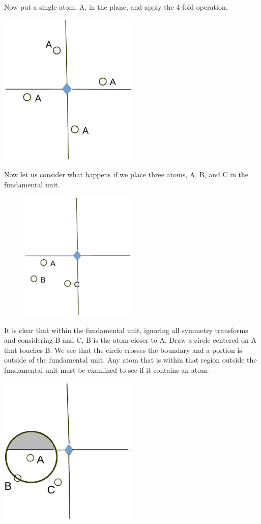 \documentclass[preprint]{iucr}              %
\numberwithin{equation}{section}
\begin{document}
	Now put a single atom, A, in the plane, and apply the
	4-fold operation.
	
		\includegraphics[width = 0.5\textwidth ]{4_2}
		
	Now let us consider what happens if we place three atoms, A, B,  and C in the fundamental unit.
	
\begin{figure}
		\includegraphics[width = 0.5\textwidth ]{4_3}
		\label{4_3}
	\caption{}
\end{figure}	
	It is clear that within the fundamental unit, ignoring all symmetry
	transforms and considering B and C, B is the atom closer to
	A. Draw a circle centered on A that touches B. We see that the
	circle crosses the boundary and a portion is outside of the
	fundamental unit. Any atom that is within that region outside the fundamental unit must be examined to see if it contains
	an atom.
	
	\includegraphics[width = 0.5\textwidth ]{4_5}
	
\end{document}
